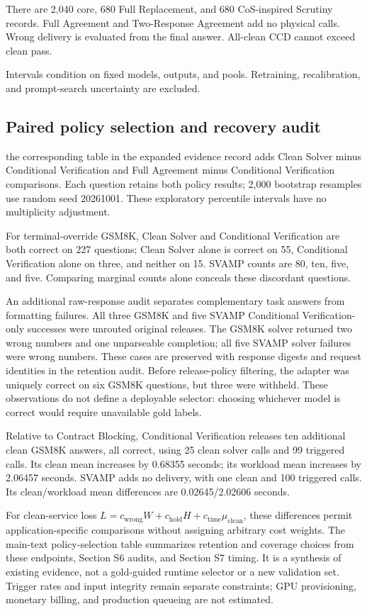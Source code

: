 \documentclass[journal,onecolumn]{IEEEtran}
\begin{document}
There are 2,040 core, 680 Full Replacement, and 680 CoS-inspired Scrutiny records. Full Agreement and Two-Response Agreement add no physical calls. Wrong delivery is evaluated from the final answer. All-clean CCD cannot exceed clean pass.


Intervals condition on fixed models, outputs, and pools. Retraining, recalibration, and prompt-search uncertainty are excluded.

\subsection{Paired policy selection and recovery audit}
the corresponding table in the expanded evidence record adds Clean Solver minus Conditional Verification and Full Agreement minus Conditional Verification comparisons. Each question retains both policy results; 2,000 bootstrap resamples use random seed 20261001. These exploratory percentile intervals have no multiplicity adjustment.


For terminal-override GSM8K, Clean Solver and Conditional Verification are both correct on 227 questions; Clean Solver alone is correct on 55, Conditional Verification alone on three, and neither on 15. SVAMP counts are 80, ten, five, and five. Comparing marginal counts alone conceals these discordant questions.

An additional raw-response audit separates complementary task answers from formatting failures. All three GSM8K and five SVAMP Conditional Verification-only successes were unrouted original releases. The GSM8K solver returned two wrong numbers and one unparseable completion; all five SVAMP solver failures were wrong numbers. These cases are preserved with response digests and request identities in the retention audit. Before release-policy filtering, the adapter was uniquely correct on six GSM8K questions, but three were withheld. These observations do not define a deployable selector: choosing whichever model is correct would require unavailable gold labels.

Relative to Contract Blocking, Conditional Verification releases ten additional clean GSM8K answers, all correct, using 25 clean solver calls and 99 triggered calls. Its clean mean increases by 0.68355 seconds; its workload mean increases by 2.06457 seconds. SVAMP adds no delivery, with one clean and 100 triggered calls. Its clean/workload mean differences are 0.02645/2.02606 seconds.

For clean-service loss $L=c_{\mathrm{wrong}}W+c_{\mathrm{hold}}H+c_{\mathrm{time}}\mu_{\mathrm{clean}}$, these differences permit application-specific comparisons without assigning arbitrary cost weights. The main-text policy-selection table summarizes retention and coverage choices from these endpoints, Section S6 audits, and Section S7 timing. It is a synthesis of existing evidence, not a gold-guided runtime selector or a new validation set. Trigger rates and input integrity remain separate constraints; GPU provisioning, monetary billing, and production queueing are not estimated.
\end{document}
